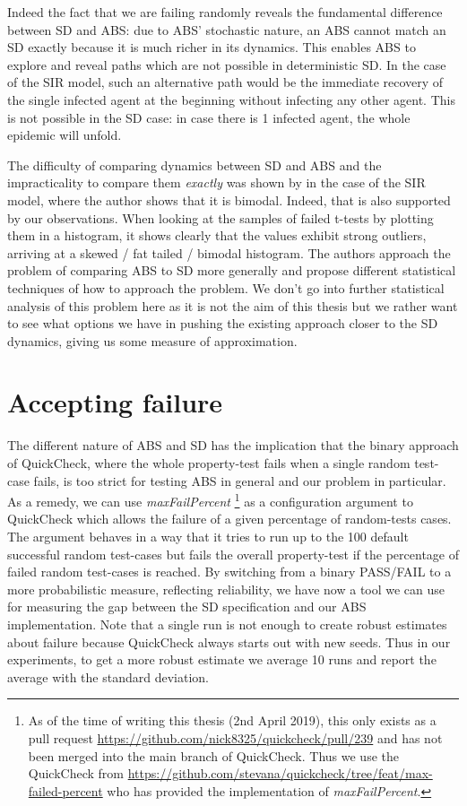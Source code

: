 Indeed the fact that we are failing randomly reveals the fundamental difference between SD and ABS: due to ABS' stochastic nature, an ABS cannot match an SD exactly because it is much richer in its dynamics. This enables ABS to explore and reveal paths which are not possible in deterministic SD. In the case of the SIR model, such an alternative path would be the immediate recovery of the single infected agent at the beginning without infecting any other agent. This is not possible in the SD case: in case there is 1 infected agent, the whole epidemic will unfold.

The difficulty of comparing dynamics between SD and ABS and the impracticality to compare them \textit{exactly} was shown by \cite{macal_agent-based_2010} in the case of the SIR model, where the author shows that it is bimodal. Indeed, that is also supported by our observations. When looking at the samples of failed t-tests by plotting them in a histogram, it shows clearly that the values exhibit strong outliers, arriving at a skewed / fat tailed / bimodal histogram. %
The authors \cite{figueredo_comparing_2014} approach the problem of comparing ABS to SD more generally and propose different statistical techniques of how to approach the problem. 
We don't go into further statistical analysis of this problem here as it is not the aim of this thesis but we rather want to see what options we have in pushing the existing approach closer to the SD dynamics, giving us some measure of approximation.

\section{Accepting failure}
The different nature of ABS and SD has the implication that the binary approach of QuickCheck, where the whole property-test fails when a single random test-case fails, is too strict for testing ABS in general and our problem in particular. As a remedy, we can use \textit{maxFailPercent} \footnote{As of the time of writing this thesis (2nd April 2019), this only exists as a pull request \url{https://github.com/nick8325/quickcheck/pull/239} and has not been merged into the main branch of QuickCheck. Thus we use the QuickCheck from \url{https://github.com/stevana/quickcheck/tree/feat/max-failed-percent} who has provided the implementation of \textit{maxFailPercent}.} as a configuration argument to QuickCheck which allows the failure of a given percentage of random-tests cases. The argument behaves in a way that it tries to run up to the 100 default successful random test-cases but fails the overall property-test if the percentage of failed random test-cases is reached. By switching from a binary PASS/FAIL to a more probabilistic measure, reflecting reliability, we have now a tool we can use for measuring the gap between the SD specification and our ABS implementation. Note that a single run is not enough to create robust estimates about failure because QuickCheck always starts out with new seeds. Thus in our experiments, to get a more robust estimate we average 10 runs and report the average with the standard deviation. 

